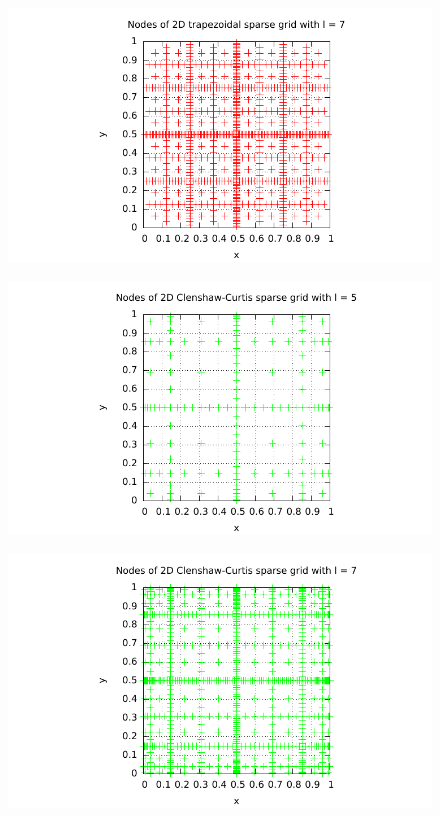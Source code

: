 \documentclass{article}
\begin{document}
\begin{figure}[htbp]
  \centering
     \includegraphics[width=1.0\textwidth]{../Task11/sh3_task11_point_plot_trapezoidal_l=7.pdf}
\end{figure}
\newpage
\begin{figure}[htbp]
  \centering
     \includegraphics[width=1.0\textwidth]{../Task11/sh3_task11_point_plot_clenshawCurtis_l=5.pdf}
\end{figure}

\begin{figure}[htbp]
  \centering
     \includegraphics[width=1.0\textwidth]{../Task11/sh3_task11_point_plot_clenshawCurtis_l=7.pdf}
\end{figure}
\newpage
\end{document}
